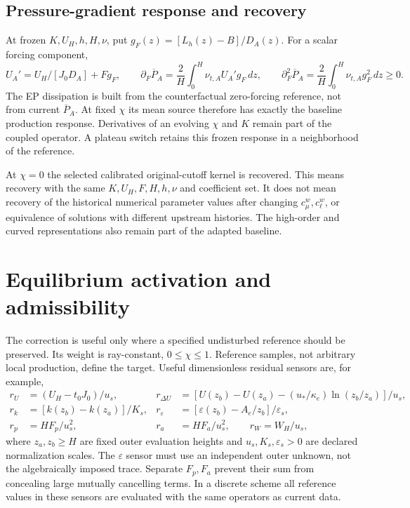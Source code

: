 \documentclass[11pt,a4paper]{article}
\numberwithin{equation}{section}
\newcommand{\eps}{\varepsilon}
\begin{document}
\subsection{Pressure-gradient response and recovery}
At frozen $K,U_H,h,H,\nu$, put
$g_F(z)=[L_h(z)-B]/D_A(z)$. For a scalar forcing component,
\begin{equation}
 U_A'=U_H/[J_0D_A]+Fg_F,\qquad
 \partial_F\overline P_A
 =\frac2H\int_0^H\nu_{t,A}U_A'g_F\,dz,\qquad
 \partial_F^2\overline P_A
 =\frac2H\int_0^H\nu_{t,A}g_F^2\,dz\geq0.
 \label{eq:wall-pressure-response}
\end{equation}
The EP dissipation is built from the counterfactual zero-forcing
reference, not from current $\overline P_A$. At fixed $\chi$ its mean
source therefore has exactly the baseline production response.
Derivatives of an evolving $\chi$ and $K$ remain part of the coupled
operator. A plateau switch retains this frozen response in a
neighborhood of the reference.

At $\chi=0$ the selected calibrated original-cutoff kernel is recovered.
This means recovery with the same $K,U_H,F,H,h,\nu$ and coefficient set.
It does not mean recovery of the historical numerical parameter values
after changing $c_\mu^w,c_\ell^w$, or equivalence of solutions with
different upstream histories. The high-order and curved representations
also remain part of the adapted baseline.

\section{Equilibrium activation and admissibility}
\label{sec:activation}
The correction is useful only where a specified undisturbed reference
should be preserved. Its weight is ray-constant, $0\leq\chi\leq1$.
Reference samples, not arbitrary local production, define the target.
Useful dimensionless residual sensors are, for example,
\begin{equation}
 \begin{aligned}
 r_U&=(U_H-t_0J_0)/u_s,&
 r_{\Delta U}&=[U(z_b)-U(z_a)
            -(u_*/\kappa_e)\ln(z_b/z_a)]/u_s,\\
 r_k&=[k(z_b)-k(z_a)]/K_s,&
 r_\eps&=[\eps(z_b)-A_e/z_b]/\eps_s,\\
 r_p&=HF_p/u_s^2,&
 r_a&=HF_a/u_s^2,\qquad r_W=W_H/u_s ,
 \end{aligned}
 \label{eq:reference-sensors}
\end{equation}
where $z_a,z_b\geq H$ are fixed outer evaluation heights and
$u_s,K_s,\eps_s>0$ are declared normalization scales.
The $\eps$ sensor must use an independent outer unknown, not the
algebraically imposed trace. Separate $F_p,F_a$ prevent their sum from
concealing large mutually cancelling terms. In a discrete scheme all
reference values in these sensors are evaluated with the same operators
as current data.
\end{document}
